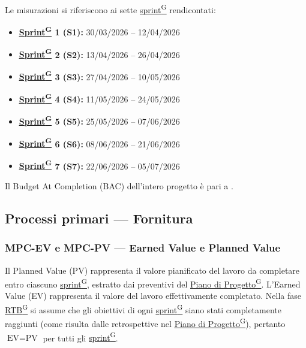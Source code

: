 \documentclass[a4paper,12pt]{article}
\providecommand{\glslink}[2]{\href{https://alittlebyte-19.github.io/Documentazione/glossario.html\#gls-#1}{\underline{#2}\textsuperscript{\scriptsize G}}}
\begin{document}
Le misurazioni si riferiscono ai sette \glslink{sprint}{sprint} rendicontati:

\begin{itemize}
    \item \textbf{\glslink{sprint}{Sprint} 1 (S1):} 30/03/2026 – 12/04/2026
    \item \textbf{\glslink{sprint}{Sprint} 2 (S2):} 13/04/2026 – 26/04/2026
    \item \textbf{\glslink{sprint}{Sprint} 3 (S3):} 27/04/2026 – 10/05/2026
    \item \textbf{\glslink{sprint}{Sprint} 4 (S4):} 11/05/2026 – 24/05/2026
    \item \textbf{\glslink{sprint}{Sprint} 5 (S5):} 25/05/2026 – 07/06/2026
    \item \textbf{\glslink{sprint}{Sprint} 6 (S6):} 08/06/2026 – 21/06/2026
    \item \textbf{\glslink{sprint}{Sprint} 7 (S7):} 22/06/2026 – 05/07/2026
\end{itemize}

Il Budget At Completion (BAC) dell'intero progetto è pari a .
\subsection{Processi primari — Fornitura}

\subsubsection{MPC-EV e MPC-PV — Earned Value e Planned Value}

Il Planned Value (PV) rappresenta il valore pianificato del lavoro da completare entro ciascuno \glslink{sprint}{sprint}, estratto dai preventivi del \glslink{piano-di-progetto}{Piano di Progetto}. L'Earned Value (EV) rappresenta il valore del lavoro effettivamente completato. Nella fase \glslink{rtb-requirements-and-technology-baseline}{RTB} si assume che gli obiettivi di ogni \glslink{sprint}{sprint} siano stati completamente raggiunti (come risulta dalle retrospettive nel \glslink{piano-di-progetto}{Piano di Progetto}), pertanto $\text{EV} = \text{PV}$ per tutti gli \glslink{sprint}{sprint}.
\end{document}
